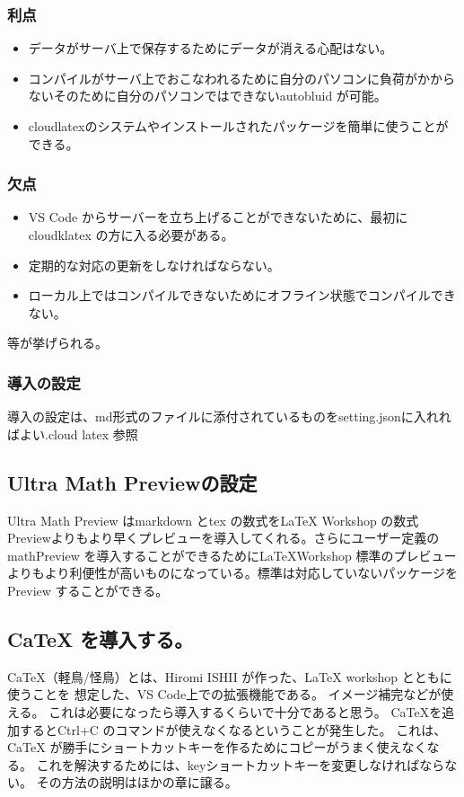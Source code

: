 \documentclass{ltjsarticle}
\begin{document}
\subsubsection*{利点}
\begin{itemize}
  \item データがサーバ上で保存するためにデータが消える心配はない。
  \item コンパイルがサーバ上でおこなわれるために自分のパソコンに負荷がかからないそのために自分のパソコンではできないautobluid が可能。
  \item cloudlatexのシステムやインストールされたパッケージを簡単に使うことができる。
\end{itemize}
\subsubsection*{欠点}
\begin{itemize}
  \item VS Code からサーバーを立ち上げることができないために、最初にcloudklatex の方に入る必要がある。
  \item 定期的な対応の更新をしなければならない。
  \item ローカル上ではコンパイルできないためにオフライン状態でコンパイルできない。
\end{itemize}
等が挙げられる。
\subsubsection{導入の設定}
導入の設定は、md形式のファイルに添付されているものをsetting.jsonに入れればよい.cloud latex 参照
\subsection{Ultra Math Previewの設定}
Ultra Math Preview はmarkdown とtex の数式をLaTeX Workshop の数式Previewよりもより早くプレビューを導入してくれる。さらにユーザー定義のmathPreview を導入することができるためにLaTeXWorkshop 標準のプレビューよりもより利便性が高いものになっている。標準は対応していないパッケージをPreview することができる。
\subsection{CaTeX を導入する。}
CaTeX（軽鳥/怪鳥）とは、Hiromi ISHII が作った、LaTeX workshop とともに使うことを
想定した、VS Code上での拡張機能である。
イメージ補完などが使える。
これは必要になったら導入するくらいで十分であると思う。
CaTeXを追加するとCtrl+C のコマンドが使えなくなるということが発生した。
これは、CaTeX が勝手にショートカットキーを作るためにコピーがうまく使えなくなる。
これを解決するためには、keyショートカットキーを変更しなければならない。
その方法の説明はほかの章に譲る。
\end{document}
